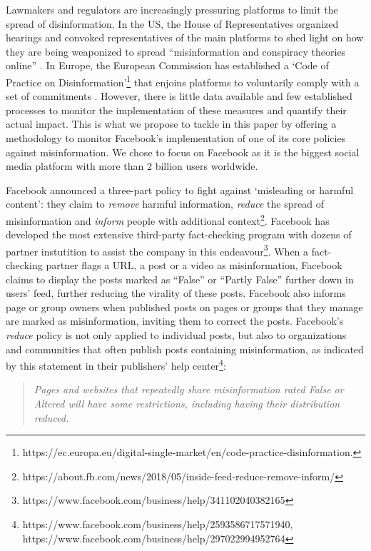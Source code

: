 \documentclass[11pt,a4paper]{article}
\begin{document}
Lawmakers and regulators are increasingly pressuring platforms to limit the spread of disinformation. 
In the US, the House of Representatives organized hearings and convoked representatives of the main platforms to shed light on how they are being weaponized to spread ``misinformation and conspiracy theories online'' \citep{donovan2020}. 
In Europe, the European Commission has established a `Code of Practice on Disinformation'\footnote{https://ec.europa.eu/digital-single-market/en/code-practice-disinformation.} that enjoins platforms to voluntarily comply with a set of commitments \citep{heldt2019let}. 
However, there is little data available and few established processes to monitor the implementation of these measures and quantify their actual impact. 
This is what we propose to tackle in this paper by offering a methodology to monitor Facebook’s implementation of one of its core policies against misinformation. 
We chose to focus on Facebook as it is the biggest social media platform with more than 2 billion users worldwide.

Facebook announced a three-part policy to fight against ‘misleading or harmful content’: they claim to \textit{remove} harmful information, \textit{reduce} the spread of misinformation and \textit{inform} people with additional context\footnote{https://about.fb.com/news/2018/05/inside-feed-reduce-remove-inform/}. 
Facebook has developed the most extensive third-party fact-checking program with dozens of partner instutition to assist the company in this endeavour\footnote{https://www.facebook.com/business/help/341102040382165}. 
When a fact-checking partner flags a URL, a post or a video as misinformation, Facebook claims to display the posts marked as “False” or “Partly False” further down in users’ feed, further reducing the virality of these posts. 
Facebook also informs page or group owners when published posts on pages or groups that they manage are marked as misinformation, inviting them to correct the posts. 
Facebook’s \textit{reduce} policy is not only applied to individual posts, but also to organizations and communities that often publish posts containing misinformation, as indicated by this statement in their publishers’ help center\footnote{https://www.facebook.com/business/help/2593586717571940, https://www.facebook.com/business/help/297022994952764}: 
\begin{quote}
\emph{Pages and websites that repeatedly share misinformation rated False or Altered will have some restrictions, including having their distribution reduced.}
\end{quote}
\end{document}
